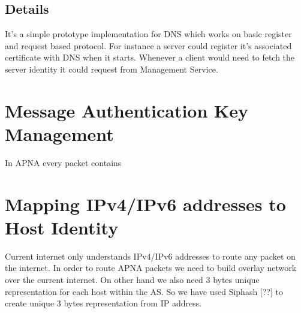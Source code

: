 \subsection{Details}
It's a simple prototype implementation for DNS which works on basic register and request based protocol. For instance a server could register it's associated certificate with DNS when it starts. Whenever a client would need to fetch the server identity it could request from Management Service.

\section{Message Authentication Key Management}
In APNA every packet contains

\section{Mapping IPv4/IPv6 addresses to Host Identity}
Current internet only understands IPv4/IPv6 addresses to route any packet on the internet. In order to route APNA packets we need to build overlay network over the current internet. On other hand we also need 3 bytes unique representation for each host within the AS. So we have used Siphash [??] to create unique 3 bytes representation from IP address.